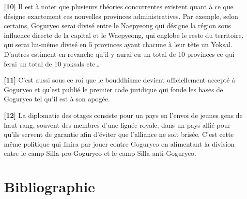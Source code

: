 \documentclass[11pt,a4paper]{article}
\begin{document}
\textbf{{[}10{]}} Il est à noter que plusieurs théories concurrentes existent quant à ce que désigne exactement ces nouvelles provinces administratives. Par exemple, selon certains, Goguryeo serai divisé entre le Naepyeong qui désigne la région sous influence directe de la capital et le Waepyeong, qui englobe le reste du territoire, qui serai lui-même divisé en 5 provinces ayant chacune à leur tête un Yoksal. D'autres estiment en revanche qu'il y aurai eu un total de 10 provinces ce qui ferai un total de 10 yoksals etc\ldots{}

\textbf{{[}11{]}} C'est aussi sous ce roi que le bouddhisme devient officiellement accepté à Goguryeo et qu'est publié le premier code juridique qui fonde les bases de Goguryeo tel qu'il est à son apogée.

\textbf{{[}12{]}} La diplomatie des otages consiste pour un pays en l'envoi de jeunes gens de haut rang, souvent des membres d'une lignée royale, dans un pays allié pour qu'ils servent de garantie afin d'éviter que l'alliance ne soit brisée. C'est cette même politique qui finira par jouer contre Goguryeo en alimentant la division entre le camp Silla pro-Goguryeo et le camp Silla anti-Goguryeo.

\section{Bibliographie}
\small
\end{document}
